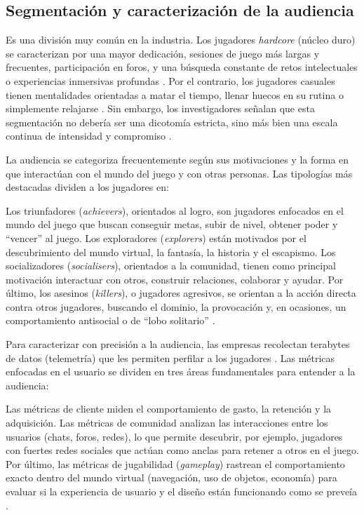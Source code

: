 \subsection{Segmentación y caracterización de la audiencia}\label{subsec:segmentacion_audiencia}

Es una división muy común en la industria. Los jugadores \emph{hardcore} (núcleo duro) se caracterizan por una mayor dedicación, sesiones de juego más largas y frecuentes, participación en foros, y una búsqueda constante de retos intelectuales o experiencias inmersivas profundas \parencite{TuunanenHamari2012}. Por el contrario, los jugadores casuales tienen mentalidades orientadas a matar el tiempo, llenar huecos en su rutina o simplemente relajarse \parencite{TuunanenHamari2012}. Sin embargo, los investigadores señalan que esta segmentación no debería ser una dicotomía estricta, sino más bien una escala continua de intensidad y compromiso \parencite{TuunanenHamari2012}.

La audiencia se categoriza frecuentemente según sus motivaciones y la forma en que interactúan con el mundo del juego y con otras personas. Las tipologías más destacadas dividen a los jugadores en:

Los triunfadores (\emph{achievers}), orientados al logro, son jugadores enfocados en el mundo del juego que buscan conseguir metas, subir de nivel, obtener poder y \enquote{vencer} al juego. Los exploradores (\emph{explorers}) están motivados por el descubrimiento del mundo virtual, la fantasía, la historia y el escapismo. Los socializadores (\emph{socialisers}), orientados a la comunidad, tienen como principal motivación interactuar con otros, construir relaciones, colaborar y ayudar. Por último, los asesinos (\emph{killers}), o jugadores agresivos, se orientan a la acción directa contra otros jugadores, buscando el dominio, la provocación y, en ocasiones, un comportamiento antisocial o de \enquote{lobo solitario} \parencite{TuunanenHamari2012}.

Para caracterizar con precisión a la audiencia, las empresas recolectan terabytes de datos (telemetría) que les permiten perfilar a los jugadores \parencite{DrachenEtAl2011}. Las métricas enfocadas en el usuario se dividen en tres áreas fundamentales para entender a la audiencia:

Las métricas de cliente miden el comportamiento de gasto, la retención y la adquisición. Las métricas de comunidad analizan las interacciones entre los usuarios (chats, foros, redes), lo que permite descubrir, por ejemplo, jugadores con fuertes redes sociales que actúan como anclas para retener a otros en el juego. Por último, las métricas de jugabilidad (\emph{gameplay}) rastrean el comportamiento exacto dentro del mundo virtual (navegación, uso de objetos, economía) para evaluar si la experiencia de usuario y el diseño están funcionando como se preveía \parencite{DrachenEtAl2011}.

